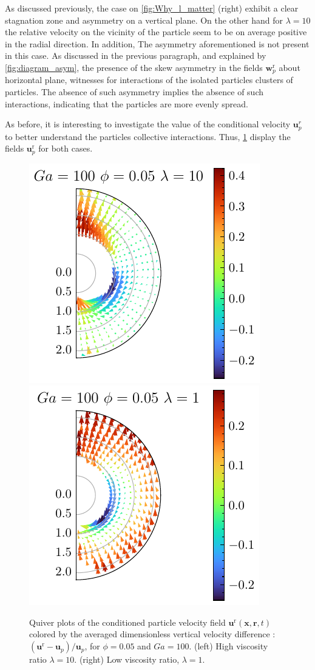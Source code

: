 As discussed previously, the case on \ref{fig:Why_l_matter} (right) exhibit a clear stagnation zone and asymmetry on a vertical plane. 
On the other hand for $\lambda =10$ the relative velocity on the vicinity of the particle seem to be on average positive in the radial direction. 
In addition, The asymmetry aforementioned is not present in this case. 
As discussed in the previous paragraph, and explained by \ref{fig:diagram_asym}, the presence of the skew asymmetry in the fields $\textbf{w}_p^\text{r}$ about horizontal plane, witnesses for interactions of the isolated particles clusters of particles.
The absence of such asymmetry implies the absence of such interactions, indicating that the particles are more evenly spread. 

As before, it is interesting to investigate the value of the conditional velocity $\textbf{u}^r_p$ to better understand the particles collective interactions. 
Thus, \ref{fig:unst_l} display the fields  $\textbf{u}_p^\text{r}$ for both cases. 
\begin{figure}[h!]
    \centering
    \includegraphics[height=0.35\textwidth]{image/HOMOGENEOUS_NEW/Dist/U_l_10_Ga_100_PHI_5.pdf}
    \includegraphics[height=0.35\textwidth]{image/HOMOGENEOUS_NEW/Dist/U_l_1_Ga_100_PHI_5.pdf}
    \caption{
         Quiver plots of the conditioned particle velocity field $\textbf{u}^\text{r}(\textbf{x},\textbf{r},t)$ colored by the averaged dimensionless vertical velocity difference : $(\textbf{u}^\text{r} - \textbf{u}_p )/ \textbf{u}_p$, for $\phi = 0.05$ and $Ga = 100$. 
         (left) High viscosity ratio $\lambda = 10$.
         (right) Low viscosity ratio, $\lambda = 1$.
         }
    \label{fig:unst_l}
\end{figure}
